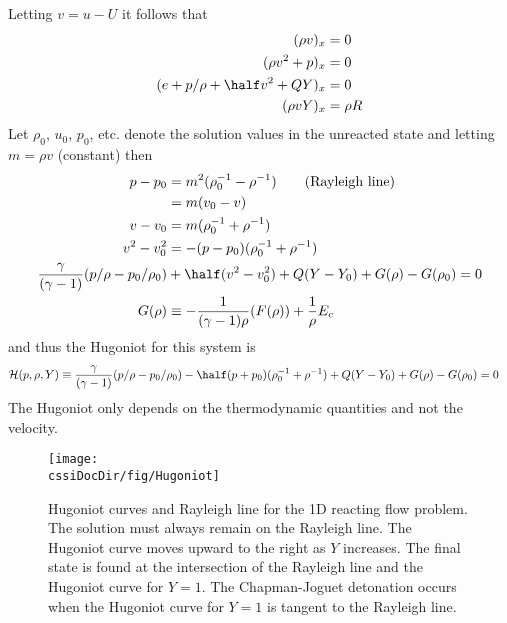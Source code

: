 \documentclass{article}
\newcommand{\obDir}{\homeHenshaw/res/OverBlown}
\newcommand{\cssiDocDir}{../cssi}
\begin{document}
Letting $v=u-U$ it follows that 
\begin{align*}
  (\rho v)_x &=0 \\
  (\rho v^2 + p )_x &=0 \\
  (e + p/\rho + \half v^2 + Q Y )_x &=0 \\
   (\rho v Y)_x &= \rho R 
\end{align*}
Let $\rho_0$, $u_0$, $p_0$, etc. denote the solution values in the unreacted state and
letting $m=\rho v$ (constant) then
\begin{align*}
   p - p_0 &= m^2 ( \rho_0^{-1} - \rho^{-1} ) \qquad\mbox{(Rayleigh line)} \\
           & = m ( v_0 - v )  \\
   v - v_0 &= m( \rho_0^{-1} + \rho^{-1} ) \\
    v^2 - v_0^2 &= -(p - p_0)( \rho_0^{-1} + \rho^{-1} ) \\
   {\gamma\over (\gamma-1)} (p/\rho - p_0/\rho_0 ) &+ \half( v^2 - v_0^2) + Q(Y-Y_0) + G(\rho)-G(\rho_0) =0\\
   G(\rho) &\equiv - {1\over (\gamma-1)\rho} (F(\rho) ) + {1 \over \rho} E_c 
\end{align*}
and thus the Hugoniot for this system is 
\begin{align*}
  {\cal H}(p,\rho,Y) &\equiv 
      {\gamma\over (\gamma-1)} (p/\rho - p_0/\rho_0 ) -\half(p + p_0)( \rho_0^{-1} + \rho^{-1} ) 
           + Q(Y-Y_0) + G(\rho)-G(\rho_0) =0
\end{align*}
The Hugoniot only depends on the thermodynamic quantities and not the velocity.


\begin{figure}[hbt]
  \begin{center}
    \texttt{[image: \\cssiDocDir/fig/Hugoniot]}
  \end{center}
\caption{Hugoniot curves and Rayleigh line for the 1D reacting flow problem. The solution must always remain
  on the Rayleigh line. The Hugoniot curve moves upward to the right as $Y$ increases. The final state
   is found at the intersection of the Rayleigh line and the Hugoniot curve for $Y=1$. The Chapman-Joguet
detonation occurs when the Hugoniot curve for $Y=1$ is tangent to the Rayleigh line.} \label{fig:Hugoniot}
\end{figure}

\end{document}
